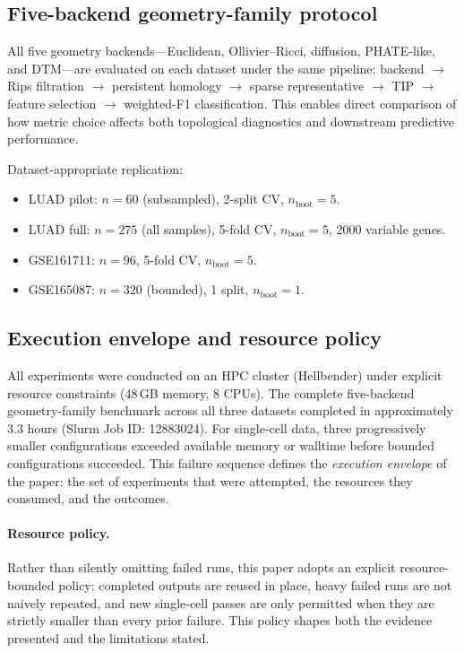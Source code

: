 \documentclass[11pt]{article}
\begin{document}
\subsection{Five-backend geometry-family protocol}

All five geometry backends---Euclidean, Ollivier--Ricci, diffusion, PHATE-like, and DTM---are evaluated on each dataset under the same pipeline: backend $\to$ Rips filtration $\to$ persistent homology $\to$ sparse representative $\to$ TIP $\to$ feature selection $\to$ weighted-F1 classification.
This enables direct comparison of how metric choice affects both topological diagnostics and downstream predictive performance.

Dataset-appropriate replication:
\begin{itemize}[leftmargin=1.5em]
\item LUAD pilot: $n = 60$ (subsampled), 2-split CV, $n_{\text{boot}} = 5$.
\item LUAD full: $n = 275$ (all samples), 5-fold CV, $n_{\text{boot}} = 5$, 2000 variable genes.
\item GSE161711: $n = 96$, 5-fold CV, $n_{\text{boot}} = 5$.
\item GSE165087: $n = 320$ (bounded), 1 split, $n_{\text{boot}} = 1$.
\end{itemize}

\subsection{Execution envelope and resource policy}

All experiments were conducted on an HPC cluster (Hellbender) under explicit resource constraints (48\,GB memory, 8 CPUs).
The complete five-backend geometry-family benchmark across all three datasets completed in approximately 3.3 hours (Slurm Job ID: 12883024).
For single-cell data, three progressively smaller configurations exceeded available memory or walltime before bounded configurations succeeded.
This failure sequence defines the \emph{execution envelope} of the paper: the set of experiments that were attempted, the resources they consumed, and the outcomes.

\paragraph{Resource policy.}
Rather than silently omitting failed runs, this paper adopts an explicit resource-bounded policy: completed outputs are reused in place, heavy failed runs are not naively repeated, and new single-cell passes are only permitted when they are strictly smaller than every prior failure.
This policy shapes both the evidence presented and the limitations stated.
\end{document}

